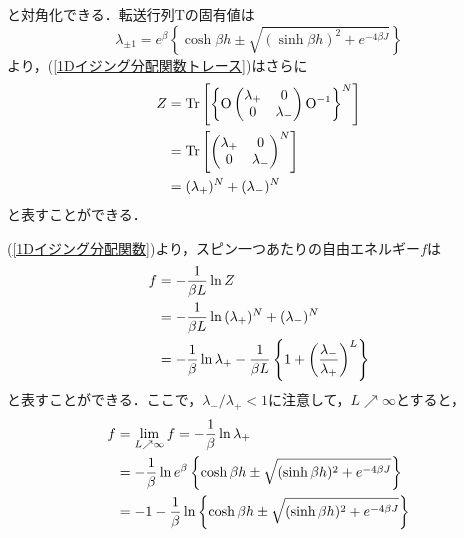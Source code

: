 \documentclass[a4paper,11pt]{jsreport}
\begin{document}
と対角化できる．転送行列$\mathrm{T}$の固有値は
\begin{equation}
  \lambda_{\pm{1}}
  = e^{\beta} \left\{ \cosh{\beta h} \pm{\sqrt{(\sinh{\beta h})^2 + e^{-4\beta J}}} \right\}
\end{equation}
より，(\ref{1Dイジング分配関数トレース})はさらに
\begin{align}
  Z
   & = \mathrm{Tr} \left[ \left\{ \mathrm{O}
  \begin{pmatrix}
      \lambda_{+} & 0           \\
      0           & \lambda_{-}
    \end{pmatrix} \mathrm{O}^{-1} \right\}^N \right] \notag   \\
   & = \mathrm{Tr} \left[
  \begin{pmatrix}
      \lambda_{+} & 0           \\
      0           & \lambda_{-}
    \end{pmatrix}^N \right] \notag                            \\
   & = (\lambda_{+})^N + (\lambda_{-})^N \label{1Dイジング分配関数}
\end{align}
と表すことができる．\par
(\ref{1Dイジング分配関数})より，スピン一つあたりの自由エネルギー$f$は
\begin{align}
  f
   & = -\frac{1}{\beta L} \ln{Z} \notag                                                                                              \\
   & = -\frac{1}{\beta L} \ln{(\lambda_{+})^N + (\lambda_{-})^N} \notag                                                              \\
   & = -\frac{1}{\beta} \ln{\lambda_{+}} - \frac{1}{\beta L} \left\{ 1 + \left( \frac{\lambda_{-}}{\lambda_{+}} \right)^{L} \right\}
\end{align}
と表すことができる．ここで，$\lambda_{-}/\lambda_{+}<1$に注意して，$L \nearrow \infty$とすると，
\begin{align}
  f
   & = \lim_{L \nearrow \infty} f = -\frac{1}{\beta} \ln{\lambda_{+}} \notag                                                   \\
   & = -\frac{1}{\beta} \ln{e^{\beta} \left\{ \cosh{\beta h} \pm{\sqrt{(\sinh{\beta h})^2 + e^{-4\beta J}}}\right\}} \notag    \\
   & = -1 -\frac{1}{\beta} \ln{\left\{\cosh{\beta h} \pm{\sqrt{(\sinh{\beta h})^2 + e^{-4\beta J}}}\right\}} \label{1D自由エネルギー}
\end{align}
\end{document}
